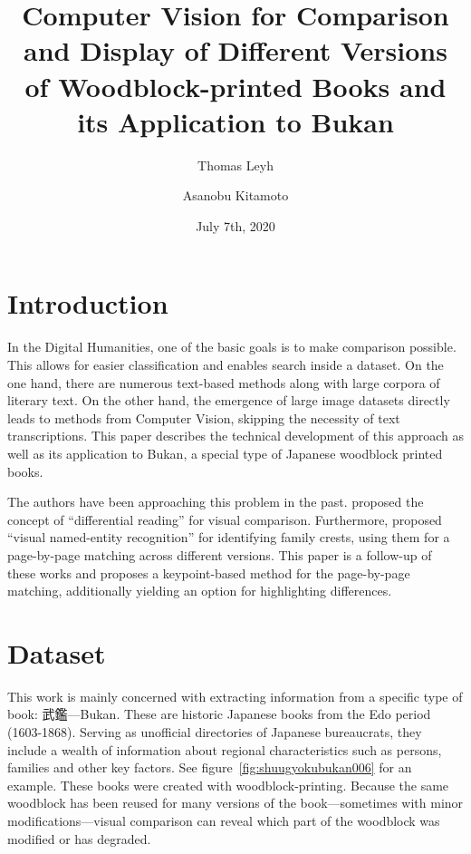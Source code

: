 \documentclass{ltjarticle}
\title{Computer Vision for Comparison and Display of Different Versions of Woodblock-printed Books and its Application to Bukan}
\author[1,3]{Thomas Leyh}
\author[2,3]{Asanobu Kitamoto}
\affil[1]{University of Freiburg}
\affil[2]{ROIS-DS Center for Open Data in the Humanities}
\affil[3]{National Institute of Informatics}
\date{July 7th, 2020}
\begin{document}
\maketitle

\section{Introduction}

In the Digital Humanities, one of the basic goals is to make comparison possible. This allows for easier classification and enables search inside a dataset. On the one hand, there are numerous text-based methods along with large corpora of literary text. On the other hand, the emergence of large image datasets directly leads to methods from Computer Vision, skipping the necessity of text transcriptions. This paper describes the technical development of this approach as well as its application to Bukan, a special type of Japanese woodblock printed books.

The authors have been approaching this problem in the past. \cite{kitamoto2018} proposed the concept of “differential reading” for visual comparison. Furthermore, \cite{hakim2019} proposed “visual named-entity recognition” for identifying family crests, using them for a page-by-page matching across different versions. This paper is a follow-up of these works and proposes a keypoint-based method for the page-by-page matching, additionally yielding an option for highlighting differences. 

\section{Dataset}

This work is mainly concerned with extracting information from a specific type of book: 武鑑---Bukan. These are historic Japanese books from the Edo period (1603-1868). Serving as unofficial directories of Japanese bureaucrats, they include a wealth of information about regional characteristics such as persons, families and other key factors. See figure~\ref{fig:shuugyokubukan006} for an example. These books were created with woodblock-printing. Because the same woodblock has been reused for many versions of the book---sometimes with minor modifications---visual comparison can reveal which part of the woodblock was modified or has degraded.
\end{document}

